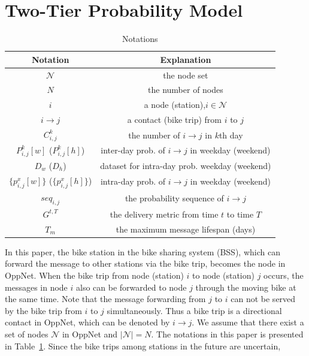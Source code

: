 \section{Two-Tier Probability Model}
\label{sec:sysmodel}
\begin{table}
  \center
  \caption{Notations}
  \label{tab:no}
  \begin{tabular}{c | c}
  \toprule[1pt]
    {\textbf{Notation}} & {\textbf{Explanation}} \\
  \toprule[0.5pt]
    {$\mathcal{N}$} & {the node set} \\
    {$N$} & {the number of nodes} \\
    {$i$} & {a node (station),$i \in \mathcal{N}$} \\
    {$i \rightarrow j$} & {a contact (bike trip) from $i$ to $j$} \\
    {$C^{k}_{i,j}$} & {the number of $i \rightarrow j$ in $k$th day} \\
    {$P_{i,j}^k[w]$ ($P_{i,j}^k[h]$)}
    & {inter-day prob. of $i \rightarrow j$ in weekday (weekend)} \\
    {$D_w$ ($D_h$)} & {dataset for intra-day prob. weekday (weekend)} \\
    {$\{p_{i, j}^x[w]\}$ ($\{p_{i, j}^x[h]\}$)}
    & {intra-day prob. of $i \rightarrow j$ in weekday (weekend)}\\
    {$seq_{i,j}$} & {the probability sequence of $i \rightarrow j$} \\
    {$G^{t, T}$} & {the delivery metric from time $t$ to time $T$} \\
    {$T_m$} & {the maximum message lifespan (days)}\\
  \bottomrule[1pt]
  \end{tabular}
\end{table}
In this paper, the bike station in the bike sharing system (BSS),
which can forward the message to other stations via the bike trip,
becomes the node in OppNet.
When the bike trip from node (station) $i$ to node (station) $j$ occurs,
the messages in node $i$ also can be forwarded to node $j$
through the moving bike at the same time.
Note that the message forwarding from $j$ to $i$ can not be served
by the bike trip from $i$ to $j$ simultaneously.
Thus a bike trip is a directional contact in OppNet,
which can be denoted by $i \rightarrow j$.
We assume that there exist a set of nodes $\mathcal{N}$ in OppNet
and $|\mathcal{N}| = N$.
The notations in this paper is presented in Table~\ref{tab:no}.
Since the bike trips among stations in the future are uncertain,

